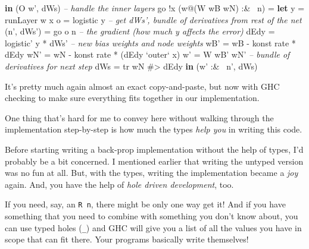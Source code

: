 \documentclass[]{article}
\newenvironment{Shaded}{}{}
\newcommand{\KeywordTok}[1]{\textcolor[rgb]{0.00,0.44,0.13}{\textbf{{#1}}}}
\newcommand{\DataTypeTok}[1]{\textcolor[rgb]{0.56,0.13,0.00}{{#1}}}
\newcommand{\CommentTok}[1]{\textcolor[rgb]{0.38,0.63,0.69}{\textit{{#1}}}}
\newcommand{\OtherTok}[1]{\textcolor[rgb]{0.00,0.44,0.13}{{#1}}}
\newcommand{\FunctionTok}[1]{\textcolor[rgb]{0.02,0.16,0.49}{{#1}}}
\newcommand{\NormalTok}[1]{{#1}}
\begin{document}
\begin{Shaded}
\begin{Highlighting}[]
          \KeywordTok{in}  \NormalTok{(}\DataTypeTok{O} \NormalTok{w', dWs)}
    \CommentTok{-- handle the inner layers}
    \NormalTok{go }\FunctionTok{!}\NormalTok{x (w}\FunctionTok{@}\NormalTok{(}\DataTypeTok{W} \NormalTok{wB wN) }\FunctionTok{:&~} \NormalTok{n)}
        \FunctionTok{=} \KeywordTok{let} \NormalTok{y          }\FunctionTok{=} \NormalTok{runLayer w x}
              \NormalTok{o          }\FunctionTok{=} \NormalTok{logistic y}
              \CommentTok{-- get dWs', bundle of derivatives from rest of the net}
              \NormalTok{(n', dWs') }\FunctionTok{=} \NormalTok{go o n}
              \CommentTok{-- the gradient (how much y affects the error)}
              \NormalTok{dEdy       }\FunctionTok{=} \NormalTok{logistic' y }\FunctionTok{*} \NormalTok{dWs'}
              \CommentTok{-- new bias weights and node weights}
              \NormalTok{wB'  }\FunctionTok{=} \NormalTok{wB }\FunctionTok{-} \NormalTok{konst rate }\FunctionTok{*} \NormalTok{dEdy}
              \NormalTok{wN'  }\FunctionTok{=} \NormalTok{wN }\FunctionTok{-} \NormalTok{konst rate }\FunctionTok{*} \NormalTok{(dEdy }\OtherTok{`outer`} \NormalTok{x)}
              \NormalTok{w'   }\FunctionTok{=} \DataTypeTok{W} \NormalTok{wB' wN'}
              \CommentTok{-- bundle of derivatives for next step}
              \NormalTok{dWs  }\FunctionTok{=} \NormalTok{tr wN }\FunctionTok{#>} \NormalTok{dEdy}
          \KeywordTok{in}  \NormalTok{(w' }\FunctionTok{:&~} \NormalTok{n', dWs)}
\end{Highlighting}
\end{Shaded}

It's pretty much again almost an exact copy-and-paste, but now with GHC checking
to make sure everything fits together in our implementation.

One thing that's hard for me to convey here without walking through the
implementation step-by-step is how much the types \emph{help you} in writing
this code.

Before starting writing a back-prop implementation without the help of types,
I'd probably be a bit concerned. I mentioned earlier that writing the untyped
version was no fun at all. But, with the types, writing the implementation
became a \emph{joy} again. And, you have the help of \emph{hole driven
development}, too.

If you need, say, an \texttt{R\ n}, there might be only one way get it! And if
you have something that you need to combine with something you don't know about,
you can use typed holes (\texttt{\_}) and GHC will give you a list of all the
values you have in scope that can fit there. Your programs basically write
themselves!
\end{document}
